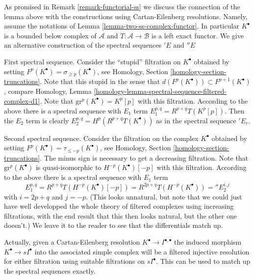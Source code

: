 \begin{remark}
\label{remark-final-functorial}
As promised in
Remark \ref{remark-functorial-ss}
we discuss the connection of the lemma
above with the constructions using Cartan-Eilenberg resolutions.
Namely, assume the notations of
Lemma \ref{lemma-two-ss-complex-functor}.
In particular $K^\bullet$ is a bounded below complex of
$\mathcal{A}$ and $T : \mathcal{A} \to \mathcal{B}$ is a
left exact functor. We give an alternative construction of the
spectral sequences ${}'E$ and ${}''E$

\medskip\noindent
First spectral sequence. Consider the ``stupid'' filtration
on $K^\bullet$
obtained by setting $F^p(K^\bullet) = \sigma_{\geq p}(K^\bullet)$, see
Homology, Section \ref{homology-section-truncations}.
Note that this stupid in the sense that
$d(F^p(K^\bullet)) \subset F^{p + 1}(K^\bullet)$, compare
Homology, Lemma \ref{homology-lemma-spectral-sequence-filtered-complex-d1}.
Note that $\text{gr}^p(K^\bullet) = K^p[p]$ with this filtration.
According to the above there is a spectral sequence
with $E_1$ term $E_1^{p, q} = R^{p + q}T(K^p[p])$.
Then the $E_2$ term is clearly $E_2^{p, q} = H^p(R^{p + q}T(K^\bullet))$
as in the spectral sequence ${}'E_r$.

\medskip\noindent
Second spectral sequence. Consider the filtration on the complex $K^\bullet$
obtained by setting $F^p(K^\bullet) = \tau_{\leq -p}(K^\bullet)$, see
Homology, Section \ref{homology-section-truncations}.
The minus sign is necessary
to get a decreasing filtration. Note that
$\text{gr}^p(K^\bullet)$ is quasi-isomorphic to $H^{-p}(K^\bullet)[-p]$
with this filtration. According to the above there is a spectral sequence
with $E_1$ term
$$
E_1^{p, q}
= R^{p + q}T(H^{-p}(K^\bullet)[-p])
= R^{2p + q}T(H^{-p}(K^\bullet)) = {}''E_2^{i, j}
$$
with $i = 2p + q$ and $j = -p$. (This looks unnatural, but note that we
could just have well developped the whole theory of filtered complexes
using increasing filtrations, with the end result that this then looks
natural, but the other one doesn't.) We leave it to the reader to see
that the differentials match up.

\medskip\noindent
Actually, given a Cartan-Eilenberg resolution
$K^\bullet \to I^{\bullet, \bullet}$ the induced morphism
$K^\bullet \to sI^\bullet$ into the associated simple complex
will be a filtered injective resolution for either filtration
using suitable filtrations on $sI^\bullet$. This can be used
to match up the spectral sequences exactly.
\end{remark}






